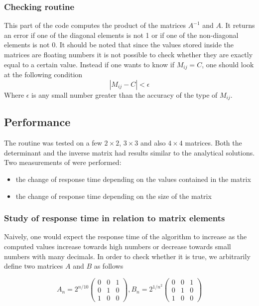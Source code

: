 \documentclass[10 pt]{article}
\begin{document}
\begin{multicols}{2}
\subsubsection{Checking routine}
This part of the code computes the product of the matrices $A^{-1}$ and $A$. It returns an error if one of the diagonal elements is not 1 or if one of the non-diagonal elements is not 0. It should be noted that since the values stored inside the matrices are floating numbers it is not possible to check whether they are exactly equal to a certain value. Instead if one wants to know if $M_{ij} = C$, one should look at the following condition
\begin{equation}
\left| M_{ij} - C \right| < \epsilon
\end{equation}
Where $\epsilon$ is any small number greater than the accuracy of the type of $M_{ij}$.

\subsection{Performance}
The routine was tested on a few $2\times 2$, $3\times 3$ and also $4\times 4$ matrices. Both the determinant and the inverse matrix had results similar to the analytical solutions. \\
Two measurements of were performed:
\begin{itemize}
\item the change of response time depending on the values contained in the matrix
\item the change of response time depending on the size of the matrix

\end{itemize}

\subsubsection{Study of response time in relation to matrix elements}

Naively, one would expect the response time of the algorithm to increase as the computed values increase towards high numbers or decrease towards small numbers with many decimals. In order to check whether it is true, we arbitrarily define two matrices $A$ and $B$ as follows

\begin{equation}
A_n = 2^{n/10}
\begin{pmatrix}
0 & 0 & 1\\
0 & 1 & 0\\
1 & 0 & 0
\end{pmatrix},
B_n = 2^{1/n^{2}}
\begin{pmatrix}
0 & 0 & 1\\
0 & 1 & 0\\
1 & 0 & 0
\end{pmatrix}
\end{equation}


\end{multicols}
\end{document}
